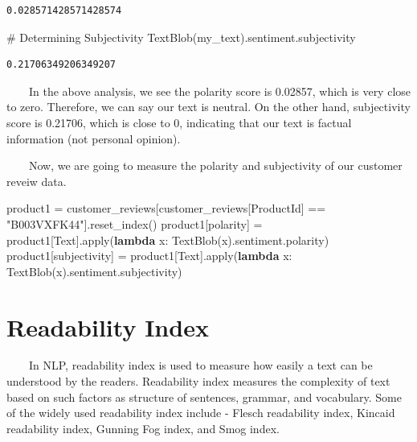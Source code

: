 \documentclass[
  letterpaper,
  DIV=11,
  numbers=noendperiod]{scrreprt}
\newenvironment{Shaded}{\begin{snugshade}}{\end{snugshade}}
\newcommand{\BuiltInTok}[1]{\textcolor[rgb]{0.00,0.23,0.31}{#1}}
\newcommand{\CommentTok}[1]{\textcolor[rgb]{0.37,0.37,0.37}{#1}}
\newcommand{\KeywordTok}[1]{\textcolor[rgb]{0.00,0.23,0.31}{\textbf{#1}}}
\newcommand{\NormalTok}[1]{\textcolor[rgb]{0.00,0.23,0.31}{#1}}
\newcommand{\OperatorTok}[1]{\textcolor[rgb]{0.37,0.37,0.37}{#1}}
\newcommand{\StringTok}[1]{\textcolor[rgb]{0.13,0.47,0.30}{#1}}
\begin{document}
\begin{verbatim}
0.028571428571428574
\end{verbatim}

\begin{Shaded}
\begin{Highlighting}[]
\CommentTok{\# Determining Subjectivity }
\NormalTok{TextBlob(my\_text).sentiment.subjectivity}
\end{Highlighting}
\end{Shaded}

\begin{verbatim}
0.21706349206349207
\end{verbatim}

~~~~In the above analysis, we see the polarity score is 0.02857, which
is very close to zero. Therefore, we can say our text is neutral. On the
other hand, subjectivity score is 0.21706, which is close to 0,
indicating that our text is factual information (not personal opinion).

~~~~Now, we are going to measure the polarity and subjectivity of our
customer reveiw data.

\begin{Shaded}
\begin{Highlighting}[]
\NormalTok{product1 }\OperatorTok{=}\NormalTok{ customer\_reviews[customer\_reviews[}\StringTok{\textquotesingle{}ProductId\textquotesingle{}}\NormalTok{] }\OperatorTok{==} \StringTok{"B003VXFK44"}\NormalTok{].reset\_index()}
\NormalTok{product1[}\StringTok{\textquotesingle{}polarity\textquotesingle{}}\NormalTok{] }\OperatorTok{=}\NormalTok{ product1[}\StringTok{\textquotesingle{}Text\textquotesingle{}}\NormalTok{].}\BuiltInTok{apply}\NormalTok{(}\KeywordTok{lambda}\NormalTok{ x: TextBlob(x).sentiment.polarity)}
\NormalTok{product1[}\StringTok{\textquotesingle{}subjectivity\textquotesingle{}}\NormalTok{] }\OperatorTok{=}\NormalTok{ product1[}\StringTok{\textquotesingle{}Text\textquotesingle{}}\NormalTok{].}\BuiltInTok{apply}\NormalTok{(}\KeywordTok{lambda}\NormalTok{ x: TextBlob(x).sentiment.subjectivity)}
\end{Highlighting}
\end{Shaded}

\section{Readability Index}\label{readability-index}

~~~~In NLP, readability index is used to measure how easily a text can
be understood by the readers. Readability index measures the complexity
of text based on such factors as structure of sentences, grammar, and
vocabulary. Some of the widely used readability index include - Flesch
readability index, Kincaid readability index, Gunning Fog index, and
Smog index.
\end{document}
